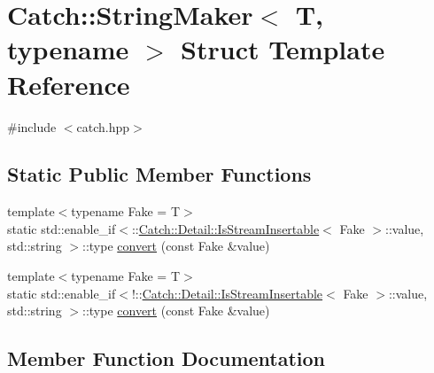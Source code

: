 \hypertarget{struct_catch_1_1_string_maker}{}\section{Catch\+:\+:String\+Maker$<$ T, typename $>$ Struct Template Reference}
\label{struct_catch_1_1_string_maker}


{\ttfamily \#include $<$catch.\+hpp$>$}

\subsection*{Static Public Member Functions}
\begin{DoxyCompactItemize}
\item 
{\footnotesize template$<$typename Fake  = T$>$ }\\static std\+::enable\+\_\+if$<$\+::\mbox{\hyperlink{class_catch_1_1_detail_1_1_is_stream_insertable}{Catch\+::\+Detail\+::\+Is\+Stream\+Insertable}}$<$ Fake $>$\+::value, std\+::string $>$\+::type \mbox{\hyperlink{struct_catch_1_1_string_maker_ab2c357e22b754802c4b1351257103eb6}{convert}} (const Fake \&value)
\item 
{\footnotesize template$<$typename Fake  = T$>$ }\\static std\+::enable\+\_\+if$<$!\+::\mbox{\hyperlink{class_catch_1_1_detail_1_1_is_stream_insertable}{Catch\+::\+Detail\+::\+Is\+Stream\+Insertable}}$<$ Fake $>$\+::value, std\+::string $>$\+::type \mbox{\hyperlink{struct_catch_1_1_string_maker_a68bb548de0e5ad364228b1ca3dd2f561}{convert}} (const Fake \&value)
\end{DoxyCompactItemize}


\subsection{Member Function Documentation}
\mbox{\label{struct_catch_1_1_string_maker_ab2c357e22b754802c4b1351257103eb6}} 
